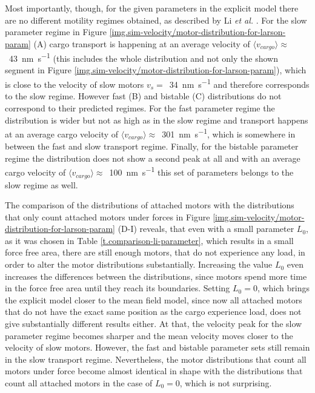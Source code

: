 Most importantly, though, for the given parameters in the explicit model there are no different motility regimes obtained, as described by Li \textit{et al.} \cite{li}. For the slow parameter regime in Figure
\ref{img.sim-velocity/motor-distribution-for-larson-param} (A) cargo transport is happening at an average velocity of \mbox{$\langle v_{cargo}\rangle \approx$ \SI{43}{\nano\metre\per\second}} (this
includes the whole distribution and not only the shown segment in Figure \ref{img.sim-velocity/motor-distribution-for-larson-param}), which is close to the velocity of slow motors
\mbox{$v_s =$ \SI{34}{\nano\metre\per\second}} and therefore corresponds to the slow regime. However fast (B) and bistable (C) distributions do not correspond to their predicted regimes. For the 
fast parameter regime the distribution is wider but not as high as in the slow regime and transport happens at an average cargo velocity of \mbox{$\langle v_{cargo}\rangle \approx$
\SI{301}{\nano\metre\per\second}}, which is somewhere in between the fast and slow transport regime. Finally, for the bistable parameter regime the distribution does not show a second peak at all
and with an average cargo velocity of \mbox{$\langle v_{cargo}\rangle \approx$ \SI{100}{\nano\metre\per\second}} this set of parameters belongs to the slow regime as well.

The comparison of the distributions of attached motors with the distributions that only count attached motors under forces in Figure
\ref{img.sim-velocity/motor-distribution-for-larson-param} (D-I) reveals, that even with a small parameter $L_0$, as it was chosen in Table \ref{t.comparison-li-parameter}, which results in a small
force free area, there are still enough motors, that do not experience any load, in order to alter the motor distributions substantially. Increasing the value $L_0$ even increases the differences
between the distributions, since motors spend more time in the force free area until they reach its boundaries. Setting $L_0 = 0$, which brings the explicit model closer to the mean field model,
since now all attached motors that do not have the exact same position as the cargo experience load, does not give substantially different results either. At that, the velocity peak for the slow
parameter regime becomes sharper and the mean velocity moves closer to the velocity of slow motors. However, the fast and bistable parameter sets still remain in the slow transport regime.
Nevertheless, the motor distributions that count all motors under force become almost identical in shape with the distributions that count all attached motors in the case of \mbox{$L_0 = 0$}, which
is not surprising.

